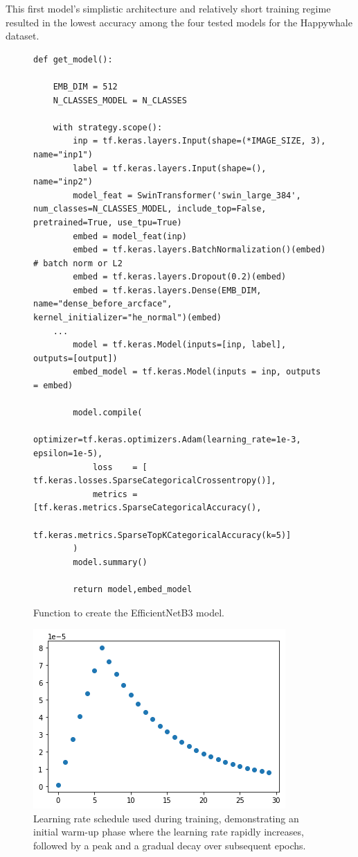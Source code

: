 \documentclass[twocolumn]{article}
\begin{document}
This first model’s simplistic architecture and relatively short training regime resulted in the lowest accuracy among the four tested models for the Happywhale dataset.

\begin{figure}[H]
\begin{minipage}{1.05\linewidth}
\begin{lstlisting}
def get_model():

    EMB_DIM = 512
    N_CLASSES_MODEL = N_CLASSES

    with strategy.scope():
        inp = tf.keras.layers.Input(shape=(*IMAGE_SIZE, 3), name="inp1")
        label = tf.keras.layers.Input(shape=(), name="inp2")
        model_feat = SwinTransformer('swin_large_384', num_classes=N_CLASSES_MODEL, include_top=False, pretrained=True, use_tpu=True)
        embed = model_feat(inp)
        embed = tf.keras.layers.BatchNormalization()(embed) # batch norm or L2
        embed = tf.keras.layers.Dropout(0.2)(embed)
        embed = tf.keras.layers.Dense(EMB_DIM, name="dense_before_arcface", kernel_initializer="he_normal")(embed)
    ...
        model = tf.keras.Model(inputs=[inp, label], outputs=[output])
        embed_model = tf.keras.Model(inputs = inp, outputs = embed)

        model.compile(
            optimizer=tf.keras.optimizers.Adam(learning_rate=1e-3, epsilon=1e-5),
            loss    = [ tf.keras.losses.SparseCategoricalCrossentropy()],
            metrics = [tf.keras.metrics.SparseCategoricalAccuracy(),
                       tf.keras.metrics.SparseTopKCategoricalAccuracy(k=5)]
        )
        model.summary()
        
        return model,embed_model
\end{lstlisting}
\end{minipage}
\caption{Function to create the EfficientNetB3 model.}
\end{figure}

\begin{figure}[H]
    \centering
    \includegraphics[width=0.5\linewidth]{learning.png}
    \caption{Learning rate schedule used during training, demonstrating an initial warm-up phase where the learning rate rapidly increases, followed by a peak and a gradual decay over subsequent epochs.}
\end{figure}
\end{document}
